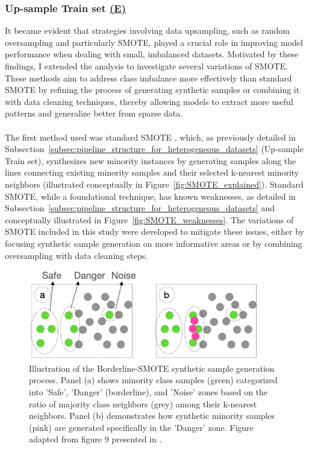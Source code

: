 \documentclass[12pt,a4paper]{report}
\begin{document}
\subsubsection*{Up-sample Train set \hyperref[fig:pipeline-2]{(E)}}
It became evident that strategies involving data upsampling, such as random oversampling and particularly SMOTE, played a crucial role in improving model performance when dealing with small, imbalanced datasets. Motivated by these findings, I extended the analysis to investigate several variations of SMOTE. These methods aim to address class imbalance more effectively than standard SMOTE by refining the process of generating synthetic samples or combining it with data cleaning techniques, thereby allowing models to extract more useful patterns and generalize better from sparse data.\\
\\
The first method used was standard SMOTE \cite{Chawla2002SMOTE}, which, as previously detailed in Subsection~\ref{subsec:pipeline_structure_for_heterogeneous_datasets} (Up-sample Train set), synthesizes new minority instances by generating samples along the lines connecting existing minority samples and their selected k-nearest minority neighbors (illustrated conceptually in Figure~\ref{fig:SMOTE_explained}). Standard SMOTE, while a foundational technique, has known weaknesses, as detailed in Subsection~\ref{subsec:pipeline_structure_for_heterogeneous_datasets} and conceptually illustrated in Figure~\ref{fig:SMOTE_weaknesses}. The variations of SMOTE included in this study were developed to mitigate these issues, either by focusing synthetic sample generation on more informative areas or by combining oversampling with data cleaning steps.\\
\begin{figure}[h!]
  \centering
  \includegraphics[width=0.9\textwidth]{images/SMOTE-Borderline.png}
  \caption[Illustration of Borderline-SMOTE Sample Generation]{Illustration of the Borderline-SMOTE synthetic sample generation process. Panel (a) shows minority class samples (green) categorized into 'Safe', 'Danger' (borderline), and 'Noise' zones based on the ratio of majority class neighbors (grey) among their k-nearest neighbors. Panel (b) demonstrates how synthetic minority samples (pink) are generated specifically in the 'Danger' zone. Figure adapted from figure 9 presented in \cite{Truong2022SMOTEVariants}.}
  \label{fig:SMOTE-Borderline}
\end{figure}
\end{document}
